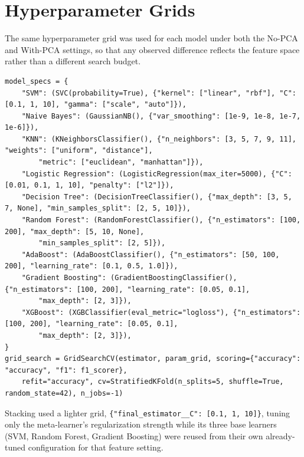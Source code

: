\documentclass[11pt,a4paper]{article}
\begin{document}
\section{Hyperparameter Grids}
The same hyperparameter grid was used for each model under both the No-PCA and With-PCA settings, so that any observed difference reflects the feature space rather than a different search budget.
\begin{lstlisting}
model_specs = {
    "SVM": (SVC(probability=True), {"kernel": ["linear", "rbf"], "C": [0.1, 1, 10], "gamma": ["scale", "auto"]}),
    "Naive Bayes": (GaussianNB(), {"var_smoothing": [1e-9, 1e-8, 1e-7, 1e-6]}),
    "KNN": (KNeighborsClassifier(), {"n_neighbors": [3, 5, 7, 9, 11], "weights": ["uniform", "distance"],
        "metric": ["euclidean", "manhattan"]}),
    "Logistic Regression": (LogisticRegression(max_iter=5000), {"C": [0.01, 0.1, 1, 10], "penalty": ["l2"]}),
    "Decision Tree": (DecisionTreeClassifier(), {"max_depth": [3, 5, 7, None], "min_samples_split": [2, 5, 10]}),
    "Random Forest": (RandomForestClassifier(), {"n_estimators": [100, 200], "max_depth": [5, 10, None],
        "min_samples_split": [2, 5]}),
    "AdaBoost": (AdaBoostClassifier(), {"n_estimators": [50, 100, 200], "learning_rate": [0.1, 0.5, 1.0]}),
    "Gradient Boosting": (GradientBoostingClassifier(), {"n_estimators": [100, 200], "learning_rate": [0.05, 0.1],
        "max_depth": [2, 3]}),
    "XGBoost": (XGBClassifier(eval_metric="logloss"), {"n_estimators": [100, 200], "learning_rate": [0.05, 0.1],
        "max_depth": [2, 3]}),
}
grid_search = GridSearchCV(estimator, param_grid, scoring={"accuracy": "accuracy", "f1": f1_scorer},
    refit="accuracy", cv=StratifiedKFold(n_splits=5, shuffle=True, random_state=42), n_jobs=-1)
\end{lstlisting}
Stacking used a lighter grid, \texttt{\{"final\_estimator\_\_C": [0.1, 1, 10]\}}, tuning only the meta-learner's regularization strength while its three base learners (SVM, Random Forest, Gradient Boosting) were reused from their own already-tuned configuration for that feature setting.

\end{document}
